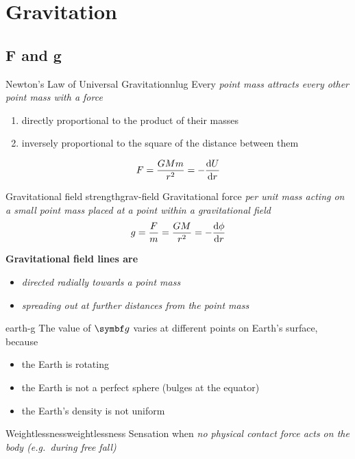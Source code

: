 \chapter{Gravitation}
\section{F and g}

\begin{definition}{Newton's Law of Universal Gravitation}{nlug}
	Every \it{point mass} attracts every other point mass with a force
	\begin{enumerate}
		\item directly proportional to the product of their masses
		\item inversely proportional to the square of the distance between them
	\end{enumerate}
	\[F = \f{GMm}{r^2} = -\odv{U}{r}\]
\end{definition}

\begin{definition}{Gravitational field strength}{grav-field}
	Gravitational force \it{per unit mass} acting on a small point mass
	placed at a point within a gravitational field
	\[g = \f{F}{m} = \f{G M}{r^2} = -\odv{\phi}{r}\]
\end{definition}

\bf{Gravitational field lines} are
\begin{itemize}
	\item \it{directed radially} towards a point mass
	\item \it{spreading out} at further distances from the point mass
\end{itemize}

\begin{example}{}{earth-g}
	The value of \(\va{g}\) varies at different points on Earth's surface, because
	\begin{itemize}
		\item the Earth is rotating
		\item the Earth is not a perfect sphere (bulges at the equator)
		\item the Earth's density is not uniform
	\end{itemize}
\end{example}

\begin{definition}{Weightlessness}{weightlessness}
	Sensation when \it{no physical contact force} acts on the body (e.g.~during free fall)
\end{definition}


